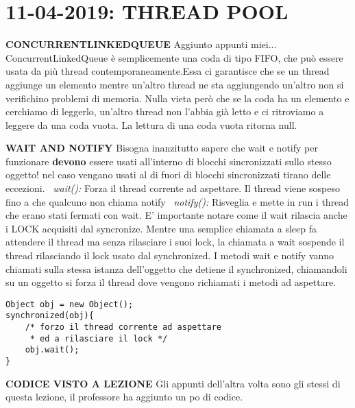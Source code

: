 

\newpage
\section{11-04-2019: THREAD POOL}
\noindent \textbf{CONCURRENTLINKEDQUEUE} \newline
Aggiunto appunti miei... ConcurrentLinkedQueue è semplicemente una coda di tipo FIFO, che può essere usata da più thread contemporaneamente.Essa ci garantisce che se un thread aggiunge un elemento mentre un'altro thread ne sta aggiungendo un'altro non si verifichino problemi di memoria. Nulla vieta però che se la coda ha un elemento e cerchiamo di leggerlo, un'altro thread non l'abbia già letto e ci ritroviamo a leggere da una coda vuota. La lettura di una coda vuota ritorna null.

\noindent \textbf{WAIT AND NOTIFY} \newline
Bisogna inanzitutto sapere che wait e notify per funzionare \textbf{devono} essere usati all'interno di blocchi sincronizzati sullo stesso oggetto! nel caso vengano usati al di fuori di blocchi sincronizzati tirano delle eccezioni. \newline
\textbullet\ \textit{wait():} Forza il thread corrente ad aspettare. Il thread viene sospeso fino a che qualcuno non chiama notify \newline
\textbullet\ \textit{notify():} Risveglia e mette in run i thread che erano stati fermati con wait. \newline
E' importante notare come il wait rilascia anche i LOCK acquisiti dal syncronize. Mentre una semplice chiamata a sleep fa attendere il thread ma senza rilasciare i suoi lock, la chiamata a wait sospende il thread rilasciando il lock usato dal synchronized.\newline
I metodi wait e notify vanno chiamati sulla stessa istanza dell'oggetto che detiene il synchronized, chiamandoli su un oggetto si forza il thread dove vengono richiamati i metodi ad aspettare.
\begin{lstlisting}
Object obj = new Object();
synchronized(obj){
	/* forzo il thread corrente ad aspettare
	 * ed a rilasciare il lock */
	obj.wait();
}
\end{lstlisting}

\noindent \textbf{CODICE VISTO A LEZIONE} \newline
\noindent Gli appunti dell'altra volta sono gli stessi di questa lezione, il professore ha aggiunto un po di codice.
 


